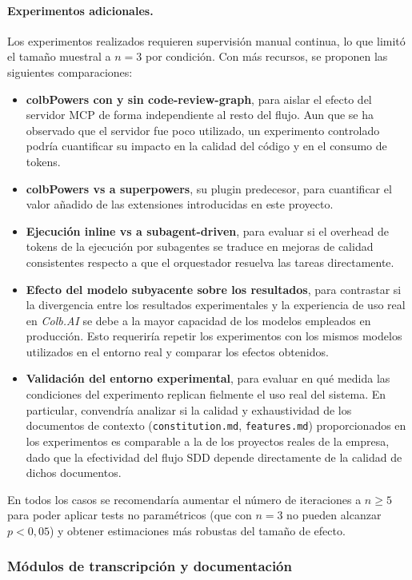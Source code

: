 \documentclass[11pt, letterpaper]{article}
\begin{document}
\paragraph{Experimentos adicionales.}
Los experimentos realizados requieren supervisión manual continua, lo que limitó el tamaño muestral a $n=3$ por condición. Con más recursos, se proponen las siguientes comparaciones:
\begin{itemize}
    \item \textbf{colbPowers con y sin code-review-graph}, para aislar el efecto del servidor MCP de forma independiente al resto del flujo. Aun que se ha observado que el servidor fue poco utilizado, un experimento controlado podría cuantificar su impacto en la calidad del código y en el consumo de tokens.
    \item \textbf{colbPowers vs a superpowers}, su plugin predecesor, para cuantificar el valor añadido de las extensiones introducidas en este proyecto.
    \item \textbf{Ejecución inline vs a subagent-driven}, para evaluar si el overhead de tokens de la ejecución por subagentes se traduce en mejoras de calidad consistentes respecto a que el orquestador resuelva las tareas directamente.
    \item \textbf{Efecto del modelo subyacente sobre los resultados}, para contrastar si la divergencia entre los resultados experimentales y la experiencia de uso real en \textit{Colb.AI} se debe a la mayor capacidad de los modelos empleados en producción. Esto requeriría repetir los experimentos con los mismos modelos utilizados en el entorno real y comparar los efectos obtenidos.
    \item \textbf{Validación del entorno experimental}, para evaluar en qué medida las condiciones del experimento replican fielmente el uso real del sistema. En particular, convendría analizar si la calidad y exhaustividad de los documentos de contexto (\texttt{constitution.md}, \texttt{features.md}) proporcionados en los experimentos es comparable a la de los proyectos reales de la empresa, dado que la efectividad del flujo SDD depende directamente de la calidad de dichos documentos.
\end{itemize}
En todos los casos se recomendaría aumentar el número de iteraciones a $n \geq 5$ para poder aplicar tests no paramétricos (que con $n=3$ no pueden alcanzar $p<0{,}05$) y obtener estimaciones más robustas del tamaño de efecto.

\subsubsection{Módulos de transcripción y documentación}
\end{document}
